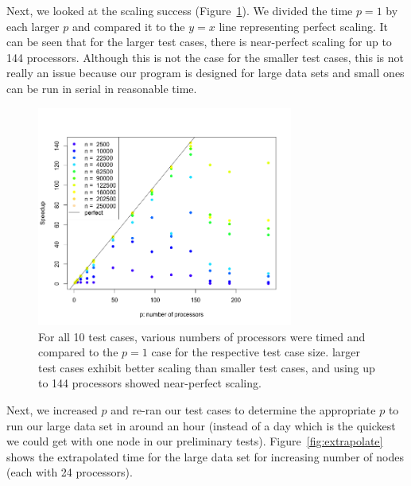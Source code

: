 Next, we looked at the scaling success (Figure~\ref{fig:scaling}). We divided the time $p=1$ by each larger $p$ and compared it to the $y=x$ line representing perfect scaling. It can be seen that for the larger test cases, there is near-perfect scaling for up to 144 processors. Although this is not the case for the smaller test cases, this is not really an issue because our program is designed for large data sets and small ones can be run in serial in reasonable time. 

\begin{figure}[!h]
   \centering
   \includegraphics[width=0.75\textwidth]{./fig/speedup.png} %
   \caption{For all 10 test cases, various numbers of processors were timed and compared to the $p=1$ case for the respective test case size. larger test cases exhibit better scaling than smaller test cases, and using up to 144 processors showed near-perfect scaling.}
   \label{fig:scaling}
\end{figure}

Next, we increased $p$ and re-ran our test cases to determine the appropriate $p$ to run our large data set in around an hour (instead of a day which is the quickest we could get with one node in our preliminary tests). Figure~\ref{fig:extrapolate} shows the extrapolated time for the large data set for increasing number of nodes (each with 24 processors).

